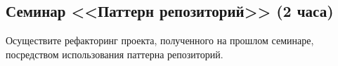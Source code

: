\subsection{Семинар <<Паттерн репозиторий>> (2 часа)}

Осуществите рефакторинг проекта, полученного на прошлом семинаре, посредством использования паттерна репозиторий.

